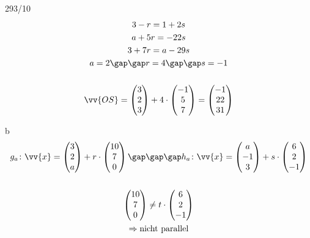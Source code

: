 \begin{exercise}{293/10}
\begin{gather*}
    3 - r = 1 + 2s \\
    a + 5r = -22s \\
    3 + 7r = a - 29s \\
    a = 2 \gap\gap r = 4 \gap\gap s = -1 \\\\
    \vv{OS} = \begin{pmatrix}3 \\ 2 \\ 3\end{pmatrix} + 4 \cdot \begin{pmatrix}-1 \\ 5 \\ 7\end{pmatrix} = \begin{pmatrix}-1 \\ 22 \\ 31\end{pmatrix}
  \end{gather*}
  \item [b]
  \begin{gather*}
    g_a \colon \vv{x} = \begin{pmatrix}3 \\ 2 \\ a\end{pmatrix} + r \cdot \begin{pmatrix}10 \\ 7 \\ 0\end{pmatrix} \gap\gap\gap h_a \colon \vv{x} = \begin{pmatrix}a \\ -1 \\ 3\end{pmatrix} + s \cdot \begin{pmatrix}6 \\ 2 \\ -1\end{pmatrix} \\\\
    \begin{pmatrix}10 \\ 7 \\ 0\end{pmatrix} \neq t \cdot \begin{pmatrix}6 \\ 2 \\ -1\end{pmatrix} \\
    \Rightarrow \text{nicht parallel} \\\\

\end{gather*}
\end{exercise}
